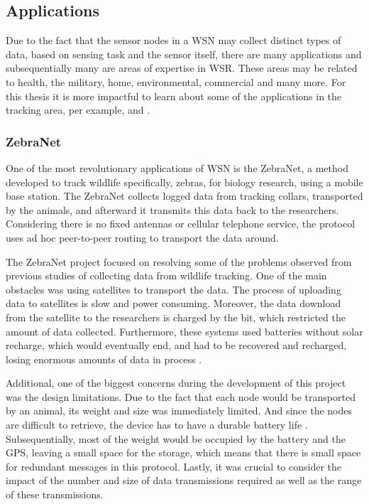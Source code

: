 \subsection{Applications}
\label{subsec:wsn_applications}
Due to the fact that the sensor nodes in a WSN may collect distinct types of data, based on
sensing task and the sensor itself, there are many applications and subsequentially many are
areas of expertise in WSR. These areas may be related to health, the military, home,
environmental, commercial and many more. For this thesis it is more impactful to learn about
some of the applications in the tracking area, per example, 
and .

\subsubsection{ZebraNet}
\label{subsubsection:zebranet}
One of the most revolutionary applications of WSN is the ZebraNet, a method developed to
track wildlife specifically, zebras, for biology research, using a mobile base station. The
ZebraNet collects logged data from tracking collars, transported by the
animals, and afterward it transmits this data back to the researchers. Considering there
is no fixed antennas or cellular telephone service, the protocol uses ad hoc
peer-to-peer routing to transport the data around.

The ZebraNet project focused on resolving some of the problems observed from previous
studies of collecting data from wildlife tracking. One of the main obstacles was using
satellites to transport the data. The process of uploading data to satellites is slow and
power consuming. Moreover, the data download from the satellite to the researchers is
charged by the bit, which restricted the amount of data collected. Furthermore, these
systems used batteries without solar recharge, which would eventually end, and had to be
recovered and recharged, losing enormous amounts of data in process \cite{Juang2002}.

Additional, one of the biggest concerns during the development of this project was the
design limitations. Due to the fact that each node would be transported by an animal,
its weight and size was immediately limited. And since the nodes are difficult to
retrieve, the device has to have a durable battery life \cite{Zhang2004}. Subsequentially,
most of the weight would be occupied by the battery and the GPS, leaving a small
space for the storage, which means that there is small space for redundant messages in this
protocol. Lastly, it was crucial to consider the impact of the number and size of data
transmissions required as well as the range of these transmissions.

